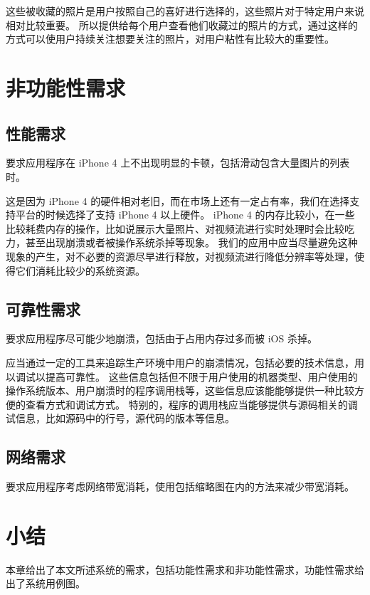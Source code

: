 这些被收藏的照片是用户按照自己的喜好进行选择的，这些照片对于特定用户来说相对比较重要。
所以提供给每个用户查看他们收藏过的照片的方式，通过这样的方式可以使用户持续关注想要关注的照片，对用户粘性有比较大的重要性。

\section{非功能性需求}

\subsection{性能需求}

要求应用程序在 iPhone 4 上不出现明显的卡顿，包括滑动包含大量图片的列表时。

这是因为 iPhone 4 的硬件相对老旧，而在市场上还有一定占有率，我们在选择支持平台的时候选择了支持 iPhone 4 以上硬件。
iPhone 4 的内存比较小，在一些比较耗费内存的操作，比如说展示大量照片、对视频流进行实时处理时会比较吃力，甚至出现崩溃或者被操作系统杀掉等现象。
我们的应用中应当尽量避免这种现象的产生，对不必要的资源尽早进行释放，对视频流进行降低分辨率等处理，使得它们消耗比较少的系统资源。

\subsection{可靠性需求}

要求应用程序尽可能少地崩溃，包括由于占用内存过多而被 iOS 杀掉。

应当通过一定的工具来追踪生产环境中用户的崩溃情况，包括必要的技术信息，用以调试以提高可靠性。
这些信息包括但不限于用户使用的机器类型、用户使用的操作系统版本、用户崩溃时的程序调用栈等，这些信息应该能能够提供一种比较方便的查看方式和调试方式。
特别的，程序的调用栈应当能够提供与源码相关的调试信息，比如源码中的行号，源代码的版本等信息。

\subsection{网络需求}

要求应用程序考虑网络带宽消耗，使用包括缩略图在内的方法来减少带宽消耗。

\section{小结}

本章给出了本文所述系统的需求，包括功能性需求和非功能性需求，功能性需求给出了系统用例图。

